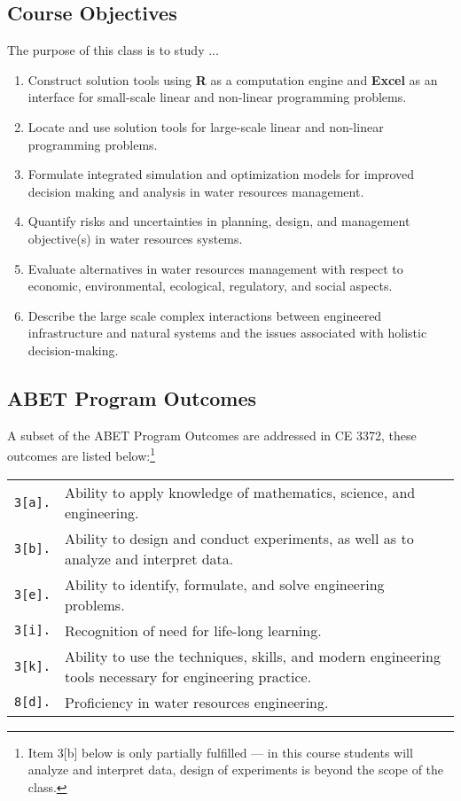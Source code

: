 \documentclass[12pt]{article}
\begin{document}
\subsection*{{Course Objectives}}
The purpose of this class is to study ...
\begin{enumerate}
\item Construct solution tools using \textbf{R} as a computation engine and \textbf{Excel} as an interface for small-scale linear and non-linear programming problems.
\item Locate and use solution tools for large-scale linear and non-linear programming problems.
\item Formulate integrated simulation and optimization models for improved decision making and analysis in water resources management.
\item Quantify risks and uncertainties in planning, design, and management objective(s) in water resources systems. 
\item Evaluate alternatives in water resources management with respect to economic, environmental, ecological, regulatory, and social aspects. 
\item Describe the large scale complex interactions between engineered infrastructure and natural systems and the issues associated with holistic decision-making.
\end{enumerate}

\subsection*{ABET Program Outcomes}
A subset of the ABET Program Outcomes are addressed in CE 3372, these outcomes are listed below:\footnote{Item 3[b] below is only partially fulfilled --- in this course students will analyze and interpret data, design of experiments is beyond the scope of the class.}


\begin{tabular}{p{0.5in}p{5.5in}}
\texttt{3[a].}  & Ability to apply knowledge of mathematics, science, and engineering.\\
\texttt{3[b].}  & Ability to design and conduct experiments, as well as to analyze and interpret data.\\
\texttt{3[e].}  & Ability to identify, formulate, and solve engineering problems.\\
\texttt{3[i].}   & Recognition of need for life-long learning.\\
\texttt{3[k].}  & Ability to use the techniques, skills, and modern engineering tools necessary for engineering practice.\\
\texttt{8[d].}  & Proficiency in water resources engineering.\\
\end{tabular}
\end{document}
